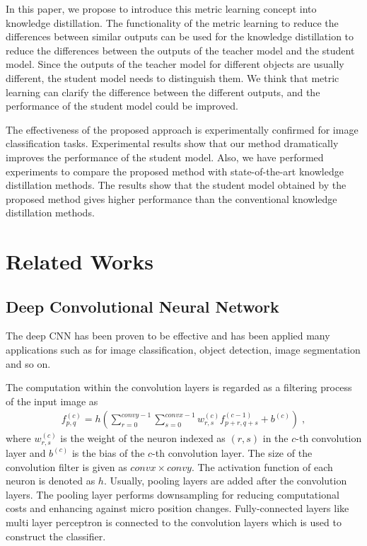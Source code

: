 \documentclass[conference]{IEEEtran}
\begin{document}
In this paper, we propose to introduce this metric learning concept into knowledge distillation.
The functionality of the metric learning to reduce the differences between similar outputs can be used for the knowledge distillation to reduce the differences between the outputs of the teacher model and the student model.
Since the outputs of the teacher model for different objects are usually different, the student model needs to distinguish them.
We think that metric learning can clarify the difference between the different outputs, and the performance of the student model could be improved.

The effectiveness of the proposed approach is experimentally confirmed for image classification tasks.
Experimental results show that our method dramatically improves the performance of the student model.
Also, we have performed experiments to compare the proposed method with state-of-the-art knowledge distillation methods.
The results show that the student model obtained by the proposed method gives higher performance than the conventional knowledge distillation methods.

\section{Related Works}

\subsection{Deep Convolutional Neural Network}

The deep CNN has been proven to be effective and has been applied many applications such as for image classification\cite{Krizhevsky2012,He2016}, object detection\cite{He2017}, image segmentation\cite{Ronneberger2015} and so on.

The computation within the convolution layers is regarded as a filtering process of the input image as
\begin{align} \label{eq:conv}
f_{p,q}^{(c)}=h(\sum^{convy-1}_{r=0}\sum^{convx-1}_{s=0}w^{(c)}_{r,s}f^{(c-1)}_{p+r, q+s}+b^{(c)}) \; ,
\end{align}
where $w^{(c)}_{r,s}$ is the weight of the neuron indexed as $(r,s)$ in the $c$-th convolution layer and $b^{(c)}$ is the bias of the $c$-th convolution layer. 
The size of the convolution filter is given as $convx \times convy$. 
The activation function of each neuron is denoted as $h$. 
Usually, pooling layers are added after the convolution layers. 
The pooling layer performs downsampling for reducing computational costs and enhancing against micro position changes. 
Fully-connected layers like multi layer perceptron is connected to the convolution layers which is used to construct the classifier. 
\end{document}
